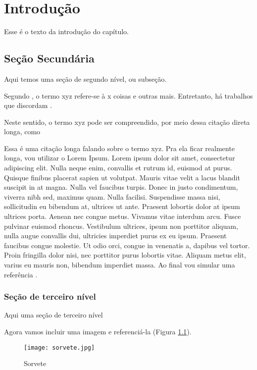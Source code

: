 \chapter{Introdução}

Esse é o texto da introdução do capítulo. 

\section{Seção Secundária}

Aqui temos uma seção de segundo nível, ou subseção.

Segundo , o termo xyz refere-se à x coisas e outras mais. Entretanto, há trabalhos que discordam \cite{ArtigoDeCongresso2017}.

Neste sentido, o termo xyz pode ser compreendido, por meio dessa citação direta longa, como

\begin{citacao}
	Essa é uma citação longa falando sobre o termo xyz. Pra ela ficar realmente longa, vou utilizar o Lorem Ipsum. Lorem ipsum dolor sit amet, consectetur adipiscing elit. Nulla neque enim, convallis et rutrum id, euismod at purus. Quisque finibus placerat sapien ut volutpat. Mauris vitae velit a lacus blandit suscipit in at magna. Nulla vel faucibus turpis. Donec in justo condimentum, viverra nibh sed, maximus quam. Nulla facilisi. Suspendisse massa nisi, sollicitudin eu bibendum at, ultrices ut ante. Praesent lobortis dolor at ipsum ultrices porta. Aenean nec congue metus. Vivamus vitae interdum arcu. Fusce pulvinar euismod rhoncus. Vestibulum ultrices, ipsum non porttitor aliquam, nulla augue convallis dui, ultricies imperdiet purus ex eu ipsum. Praesent faucibus congue molestie. Ut odio orci, congue in venenatis a, dapibus vel tortor. Proin fringilla dolor nisi, nec porttitor purus lobortis vitae. Aliquam metus elit, varius eu mauris non, bibendum imperdiet massa. Ao final vou simular uma referência \cite[p.20]{Livro1990}.
\end{citacao}

\subsection{Seção de terceiro nível} \label{sec:outra}

Aqui uma seção de terceiro nível

Agora vamos incluir uma imagem e referenciá-la (Figura \ref{fig:sorvete}).

\begin{figure}[H]
	\centering
	\caption{Sorvete}
	\centering
	\texttt{[image: sorvete.jpg]}
	\label{fig:sorvete}
\end{figure}

